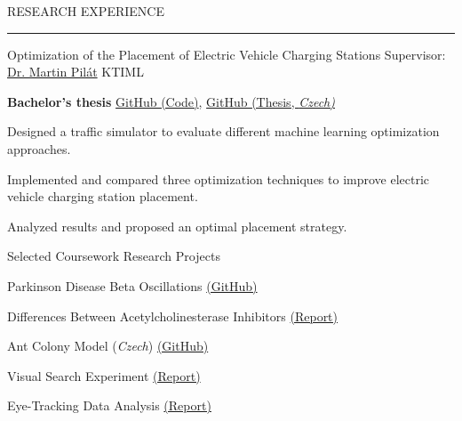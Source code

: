 \documentclass{resume} %
\renewenvironment{rSection}[1]{
\sectionskip
\textcolor{CarnegieMellonRed}{\MakeUppercase{#1}}
\sectionlineskip
\hrule
\begin{list}{}{
\setlength{\leftmargin}{1.5em}
}
\item[]
}{
\end{list}
}
\begin{document}
\begin{rSection}{Research Experience}
\begin{rProject}{\large Optimization of the Placement of Electric Vehicle Charging Stations}{}
{Supervisor: \href{https://www.mff.cuni.cz/en/faculty/organizational-structure/people?hdl=4171}
{Dr. Martin Pilát}}
{KTIML}
    \item \textbf{Bachelor's thesis} \vline \: 
    \href{https://github.com/dbeinhauer/bcs-source}{GitHub (Code)},
    \href{https://github.com/dbeinhauer/bcs-thesis}{GitHub (Thesis, \em Czech)}
    \item Designed a traffic simulator to evaluate different machine learning 
    optimization approaches.
    \item Implemented and compared three optimization techniques to improve 
    electric vehicle charging station placement.
    \item Analyzed results and proposed an optimal placement strategy.
\end{rProject}

\begin{rProject}{\large Selected Coursework Research Projects}{}
{}{}{}
    \item Parkinson Disease Beta Oscillations 
    {\href{https://github.com/dbeinhauer/parkinson_disease_project}{(GitHub)}}
    \item Differences Between Acetylcholinesterase Inhibitors
    {\href{https://github.com/dbeinhauer/acetylcholinester_inhibitors/blob/main/TeX/main.pdf}{(Report)}}
    \item Ant Colony Model (\emph{Czech})
    {\href{https://github.com/dbeinhauer/ant_colony_model/tree/main}{(GitHub)}}
    \item Visual Search Experiment 
    {\href{https://raw.githack.com/dbeinhauer/visual_search_experiment/main/visual-search-experiment-report.html}{(Report)}}
    \item Eye-Tracking Data Analysis 
    {\href{https://raw.githack.com/dbeinhauer/etra_challenge/main/etra_challenge_report.html}{(Report)}}
\end{rProject}

\end{rSection}

\end{document}
